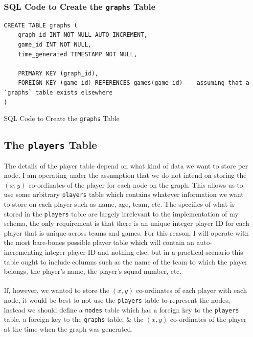\documentclass[a4paper,11pt]{article}
\newenvironment{code}{\captionsetup{type=listing}}{}
\begin{document}
\subsubsection{SQL Code to Create the \texttt{graphs} Table}
\begin{code}
\begin{verbatim}
CREATE TABLE graphs (
    graph_id INT NOT NULL AUTO_INCREMENT,
    game_id INT NOT NULL,
    time_generated TIMESTAMP NOT NULL,

    PRIMARY KEY (graph_id),
    FOREIGN KEY (game_id) REFERENCES games(game_id) -- assuming that a `graphs` table exists elsewhere 
)
\end{verbatim}
\caption{SQL Code to Create the \texttt{graphs} Table}
\end{code}

\subsection{The \texttt{players} Table}
The details of the player table depend on what kind of data we want to store per node. 
I am operating under the assumption that we do not intend on storing the $(x,y)$ co-ordinates of the player for each node on the graph. 
This allows us to use some arbitrary \texttt{players} table which contains whatever information we want to store on each player such as name, age, team, etc.
The specifics of what is stored in the \texttt{players} table are largely irrelevant to the implementation of my schema, the only requirement is that there is an unique integer player ID for 
each player that is unique across teams and games.
For this reason, I will operate with the most bare-bones possible player table which will contain an auto-incrementing integer player ID and nothing else, but in a practical scenario this table ought to 
include columns such as the name of the team to which the player belongs, the player's name, the player's squad number, etc.
\\\\
If, however, we wanted to store the $(x,y)$ co-ordinates of each player with each node, it would be best to not use the \texttt{players} table to represent the nodes; instead we should define a 
\texttt{nodes} table which has a foreign key to the \texttt{players} table, a foreign key to the \texttt{graphs} table, \& the $(x,y)$ co-ordinates of the player at the time 
when the graph was generated.
\end{document}
